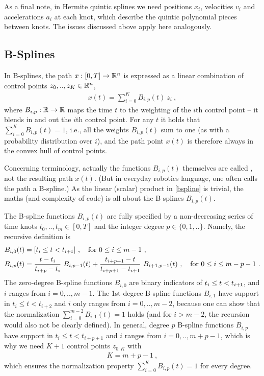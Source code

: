 As a final note, in Hermite quintic splines we need positions $x_i$,
velocities $v_i$ and accelerations $a_i$ at each knot, which describe
the quintic polynomial pieces between knots. The issues discussed
above apply here analogously.

\subsection{B-Splines}

In B-splines, the path $x: [0,T] \to {\mathbb{R}}^n$ is expressed as a linear
combination of control points $z_0,.., z_K \in {\mathbb{R}}^n$,
\begin{align}\label{bspline}
x(t) = \sum_{i=0}^K B_{i,p}(t)~ z_i ~,
\end{align}
where $B_{i,p}: {\mathbb{R}} \to {\mathbb{R}}$ maps the time $t$ to the weighting of
the $i$th control point -- it blends in and out the $i$th control
point. For any $t$ it holds that $\sum_{i=0}^K B_{i,p}(t) = 1$, i.e.,
all the weights $B_{i,p}(t)$ sum to one (as with a probability
distribution over $i$), and the path point $x(t)$ is therefore always
in the convex hull of control points.

Concerning terminology, actually the functions $B_{i,p}(t)$ themselves
are called , not the resulting path $x(t)$. (But in
everyday robotics language, one often calls the path a B-spline.) As
the linear (scalar) product in \eqref{bspline} is trivial, the maths
(and complexity of code) is all about the B-splines $B_{i,p}(t)$.

The B-spline functions $B_{i,p}(t)$ are fully specified by a
non-decreasing series of time knots $t_0,..,t_m \in [0,T]$ and the
integer degree $p\in\{0,1,..\}$. Namely, the recursive definition is
\begin{align}
B_{i,0}(t) &= [t_i \le t < t_{i{{\hspace*{-.0pt}\text{\rm +}\hspace*{-.5pt}}1}}] ~,\quad \text{for $0\le i \le m-1$} ~,\\
B_{i,p}(t)
&= \frac{t-t_i}{t_{i+p}-t_i}~ B_{i,p-1}(t)
 +  \frac{t_{i+p+1}-t}{t_{i+p+1}-t_{i+1}}~ B_{i+1,p-1}(t)  ~,\quad \text{for $0\le i \le m-p-1$} ~.
\end{align}
The zero-degree B-spline functions $B_{i,0}$ are binary indicators of
$t_i \le t < t_{i{{\hspace*{-.0pt}\text{\rm +}\hspace*{-.5pt}}1}}$, and $i$ ranges from $i=0,..,m-1$. The
1st-degree B-spline functions $B_{i,1}$ have support in $t_i \le t <
t_{i+2}$ and $i$ only ranges from $i=0,..,m-2$, because one can show
that the normalization $\sum_{i=0}^{m-2} B_{i,1}(t) = 1$ holds (and
for $i>m-2$, the recursion would also not be clearly defined). In
general, degree $p$ B-spline functions $B_{i,p}$ have support in
$t_i \le t < t_{i+p+1}$ and $i$ ranges from $i=0,..,m+p-1$, which is
why we need $K+1$ control points $z_{0:K}$ with
\begin{align}
    K = m+p-1 ~,
\end{align}
which ensures the normalization property $\sum_{i=0}^K B_{i,p}(t) = 1$ for every degree.

